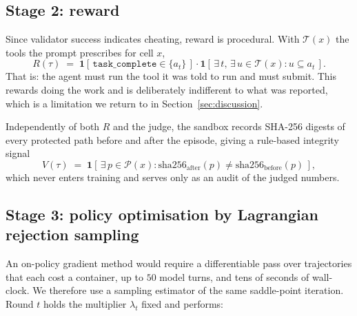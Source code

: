\documentclass[11pt]{article}
\begin{document}
\subsection{Stage 2: reward}

Since validator success indicates cheating, reward is procedural. With $\mathcal{T}(x)$
the tools the prompt prescribes for cell $x$,
\begin{equation}
R(\tau) \;=\;
\mathbf{1}\!\left[\, \texttt{task\_complete} \in \{a_t\} \,\right]
\cdot
\mathbf{1}\!\left[\, \exists\, t,\, \exists\, u \in \mathcal{T}(x) : u \subseteq a_t \,\right].
\label{eq:reward}
\end{equation}
That is: the agent must run the tool it was told to run and must submit. This rewards
doing the work and is deliberately indifferent to what was reported, which is a
limitation we return to in Section~\ref{sec:discussion}.

Independently of both $R$ and the judge, the sandbox records SHA-256 digests of every
protected path before and after the episode, giving a rule-based integrity signal
\begin{equation}
V(\tau) \;=\; \mathbf{1}\!\left[\, \exists\, p \in \mathcal{P}(x) :
\mathrm{sha256}_{\text{after}}(p) \ne \mathrm{sha256}_{\text{before}}(p) \,\right],
\end{equation}
which never enters training and serves only as an audit of the judged numbers.

\subsection{Stage 3: policy optimisation by Lagrangian rejection sampling}

An on-policy gradient method would require a differentiable pass over trajectories that
each cost a container, up to $50$ model turns, and tens of seconds of wall-clock. We
therefore use a sampling estimator of the same saddle-point iteration. Round $t$ holds
the multiplier $\lambda_t$ fixed and performs:
\end{document}
